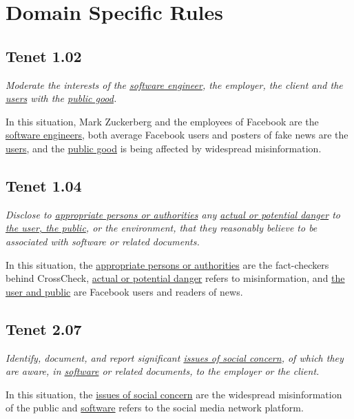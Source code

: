 
\section{Domain Specific Rules}

\subsection{Tenet 1.02}

\emph{Moderate the interests of the \underline{software engineer}, the employer, the client and the \underline{users} with the \underline{public good}. \cite{se_code}}

In this situation, Mark Zuckerberg and the employees of Facebook are the \underline{software engineers}, both average Facebook users and posters of fake news are the \underline{users}, and the \underline{public good} is being affected by widespread misinformation.

\subsection{Tenet 1.04}

\emph{Disclose to \underline{appropriate persons or authorities} any \underline{actual or potential danger} to \underline{the user, the public}, or the environment, that they reasonably believe to be associated with software or related documents. \cite{se_code}}

In this situation, the \underline{appropriate persons or authorities} are the fact-checkers behind CrossCheck, \underline{actual or potential danger} refers to misinformation, and \underline{the user and public} are Facebook users and readers of news.

\subsection{Tenet 2.07}

\emph{Identify, document, and report significant \underline{issues of social concern}, of which they are aware, in \underline{software} or related documents, to the employer or the client. \cite{se_code}}

In this situation, the \underline{issues of social concern} are the widespread misinformation of the public and \underline{software} refers to the social media network platform.

